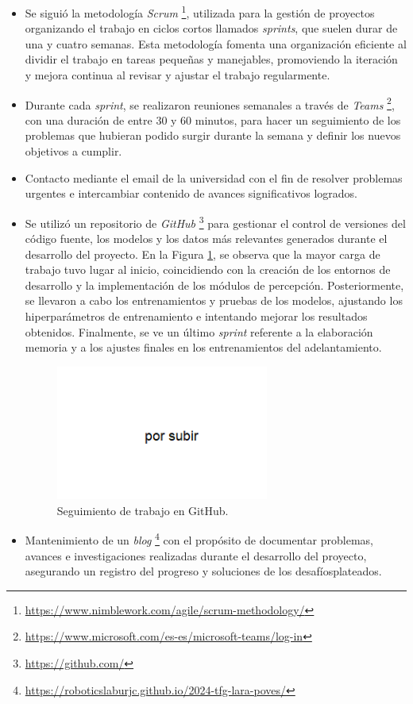 \begin{itemize}
\item Se siguió la metodología \textit{Scrum} \footnote{\url{https://www.nimblework.com/agile/scrum-methodology/}}, utilizada para la gestión de proyectos organizando el trabajo en ciclos cortos llamados \textit{sprints}, que suelen durar de una y cuatro semanas. Esta metodología fomenta una organización eficiente al dividir el trabajo en tareas pequeñas y manejables, promoviendo la iteración y mejora continua al revisar y ajustar el trabajo regularmente.
\item Durante cada \textit{sprint}, se realizaron reuniones semanales a través de \textit{Teams} \footnote{\url{https://www.microsoft.com/es-es/microsoft-teams/log-in}}, con una duración de entre 30 y 60 minutos, para hacer un seguimiento de los problemas que hubieran podido surgir durante la semana y definir los nuevos objetivos a cumplir.
\item Contacto mediante el email de la universidad con el fin de resolver problemas urgentes e intercambiar contenido de avances significativos logrados.
\item Se utilizó un repositorio de \textit{GitHub} \footnote{\url{https://github.com/}} para gestionar el control de versiones del código fuente, los modelos y los datos más relevantes generados durante el desarrollo del proyecto. En la Figura \ref{fig:github}, se observa que la mayor carga de trabajo tuvo lugar al inicio, coincidiendo con la creación de los entornos de desarrollo y la implementación de los módulos de percepción. Posteriormente, se llevaron a cabo los entrenamientos y pruebas de los modelos, ajustando los hiperparámetros de entrenamiento e intentando mejorar los resultados obtenidos. Finalmente, se ve un último \textit{sprint} referente a la elaboración memoria y a los ajustes finales en los entrenamientos del adelantamiento.

\begin{figure}[ht]
\centering
\includegraphics[width=7cm]{figs/objetivos/github.png}
\caption{Seguimiento de trabajo en GitHub.}
\label{fig:github}
\end{figure}

\item Mantenimiento de un \textit{blog} \footnote{\url{https://roboticslaburjc.github.io/2024-tfg-lara-poves/}} con el propósito de documentar problemas, avances e investigaciones realizadas durante el desarrollo del proyecto, asegurando un registro del progreso y soluciones de los desafíosplateados.

\end{itemize}

